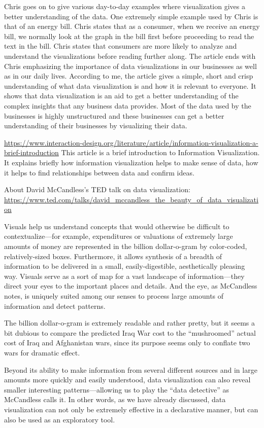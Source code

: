 \documentclass[]{book}
\theoremstyle{definition}
\theoremstyle{definition}
\theoremstyle{definition}
\theoremstyle{remark}
\begin{document}
Chris goes on to give various day-to-day examples where visualization
gives a better understanding of the data. One extremely simple example
used by Chris is that of an energy bill. Chris states that as a
consumer, when we receive an energy bill, we normally look at the graph
in the bill first before proceeding to read the text in the bill. Chris
states that consumers are more likely to analyze and understand the
visualizations before reading further along. The article ends with Chris
emphasizing the importance of data visualizations in our businesses as
well as in our daily lives. According to me, the article gives a simple,
short and crisp understanding of what data visualization is and how it
is relevant to everyone. It shows that data visualization is an aid to
get a better understanding of the complex insights that any business
data provides. Most of the data used by the businesses is highly
unstructured and these businesses can get a better understanding of
their businesses by visualizing their data.

\url{https://www.interaction-design.org/literature/article/information-visualization-a-brief-introduction}
This article is a brief introduction to Information Visualization. It
explains briefly how information visualization helps to make sense of
data, how it helps to find relationships between data and confirm ideas.

About David McCandless's TED talk on data visualization:
\url{https://www.ted.com/talks/david_mccandless_the_beauty_of_data_visualization}

Visuals help us understand concepts that would otherwise be difficult to
contextualize---for example, expenditures or valuations of extremely
large amounts of money are represented in the billion dollar-o-gram by
color-coded, relatively-sized boxes. Furthermore, it allows synthesis of
a breadth of information to be delivered in a small, easily-digestible,
aesthetically pleasing way. Visuals serve as a sort of map for a vast
landscape of information---they direct your eyes to the important places
and details. And the eye, as McCandless notes, is uniquely suited among
our senses to process large amounts of information and detect patterns.

The billion dollar-o-gram is extremely readable and rather pretty, but
it seems a bit dubious to compare the predicted Iraq War cost to the
``mushroomed'' actual cost of Iraq and Afghanistan wars, since its
purpose seems only to conflate two wars for dramatic effect.

Beyond its ability to make information from several different sources
and in large amounts more quickly and easily understood, data
visualization can also reveal smaller interesting patterns---allowing us
to play the ``data detective'' as McCandless calls it. In other words,
as we have already discussed, data visualization can not only be
extremely effective in a declarative manner, but can also be used as an
exploratory tool.
\end{document}
